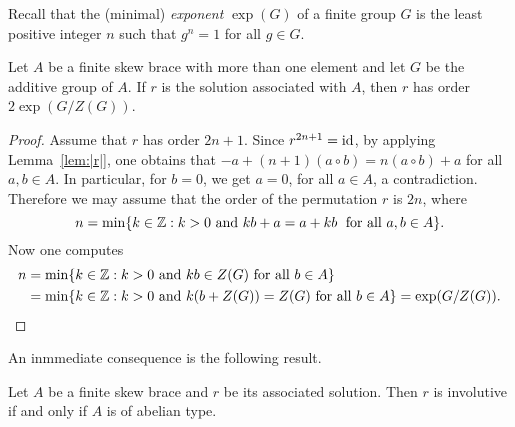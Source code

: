 %

Recall that the (minimal) \emph{exponent} $\exp(G)$ of a 
finite group $G$ is the least positive integer $n$ such that 
$g^n=1$ for all $g\in G$. 

\begin{theorem} 
\label{thm:|r|} 
  Let $A$ be a finite skew brace with more than one
  element and let $G$ be the additive group of $A$. 
  If $r$ is the solution associated with $A$, 
  then $r$ has order $2\exp(G/Z(G))$.
\end{theorem}

\begin{proof} 
  Assume that $r$ has order $2n+1$. Since $r^{2n+1}=\operatorname{id}$, by applying
  Lemma~\ref{lem:|r|}, one obtains that $-a+(n+1)(a\circ b)=n(a\circ b)+a$
  for all $a,b\in A$. In particular, for $b=0$, we get $a=0$, for all $a\in A$, a contradiction. 
  Therefore we may assume that the order of the permutation $r$ is
  $2n$, where 
  \[
  n=\min\{k\in\mathbb{Z}: k>0\text{ and }kb+a=a+kb\;\text{ for all }a,b\in A\}.
  \]
  Now one computes
  \begin{align*} 
  n&=\min\{k\in\mathbb{Z}: k>0\text{ and }kb\in Z(G)\text{ for all }b\in A\}\\ 
  &=\min\{k\in\mathbb{Z}: k>0\text{ and }k(b+Z(G)) = Z(G)\text{ for all }b\in A\} =\exp(G/Z(G)).\qedhere
  \end{align*}
\end{proof}

An inmmediate consequence is the following result.

\begin{corollary}
    Let $A$ be a finite skew brace and $r$ be its associated solution. Then 
    $r$ is involutive if and only if $A$ is of abelian type.
    \end{corollary}


